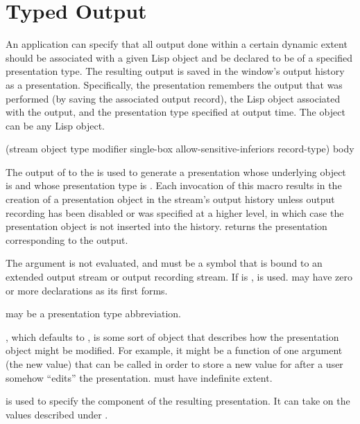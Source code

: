 \section {Typed Output}

An application can specify that all output done within a certain dynamic extent
should be associated with a given Lisp object and be declared to be of a
specified presentation type.  The resulting output is saved in the window's
output history as a presentation.  Specifically, the presentation remembers the
output that was performed (by saving the associated output record), the Lisp
object associated with the output, and the presentation type specified at output
time.  The object can be any Lisp object.


 {(stream object type
                                          \key modifier single-box
                                               allow-sensitive-inferiors record-type)
                                         \body body} 

The output of  to the   is
used to generate a presentation whose underlying object is  and
whose presentation type is .  Each invocation of this macro results in
the creation of a presentation object in the stream's output history unless
output recording has been disabled or  was
specified at a higher level, in which case the presentation object is not
inserted into the history.   returns the
presentation corresponding to the output.

The  argument is not evaluated, and must be a symbol that is bound
to an extended output stream or output recording stream.  If  is
,  is used.  may have zero or more
declarations as its first forms.

 may be a presentation type abbreviation.

, which defaults to , is some sort of object that
describes how the presentation object might be modified.  For example, it might
be a function of one argument (the new value) that can be called in order to
store a new value for  after a user somehow ``edits'' the
presentation.   must have indefinite extent.

 is used to specify the  component
of the resulting presentation.  It can take on the values described under
.

